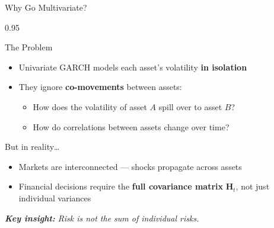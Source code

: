 \documentclass[9pt, aspectratio=169, t]{beamer}
\begin{document}
\begin{frame}{Why Go Multivariate?}
    \begin{cminipage}{0.95\textwidth}
    {\footnotesize
    \begin{block}{The Problem}
        \begin{itemize}\setlength{\itemsep}{2pt}
            \item Univariate GARCH models each asset's volatility \textbf{in isolation}
            \item They ignore \textbf{co-movements} between assets:
                \begin{itemize}\setlength{\itemsep}{0pt}
                    \item How does the volatility of asset $A$ spill over to asset $B$?
                    \item How do correlations between assets change over time?
                \end{itemize}
        \end{itemize}
    \end{block}
    \vspace{0.1cm}
    \begin{alertblock}{But in reality\ldots}
        \begin{itemize}\setlength{\itemsep}{0pt}
            \item Markets are interconnected --- shocks propagate across assets
            \item Financial decisions require the \textbf{full covariance matrix} $\mathbf{H}_t$, not just individual variances
        \end{itemize}
    \end{alertblock}
    \vspace{0.2cm}
    \textit{\textbf{Key insight:} Risk is not the sum of individual risks.}
    }
    \end{cminipage}
\end{frame}
\end{document}
